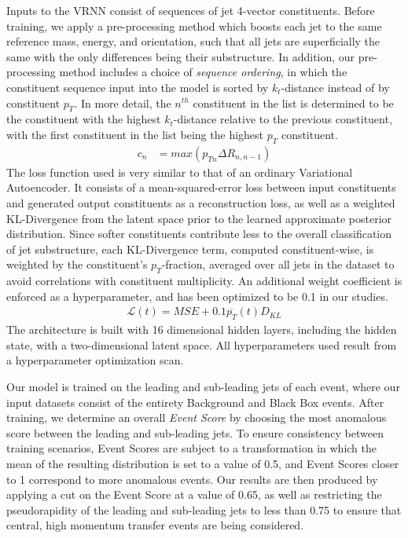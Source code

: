 \documentclass[letterpaper,11pt]{article}
\begin{document}
Inputs to the VRNN consist of sequences of jet 4-vector constituents. Before training, we apply a pre-processing method which boosts each jet to the same reference mass, energy, and orientation, such that all jets are superficially the same with the only differences being their substructure. In addition, our pre-processing method includes a choice of \textit{sequence ordering}, in which the constituent sequence input into the model is sorted by $k_{t}$-distance instead of by constituent $p_{T}$. In more detail, the $n^{th}$ constituent in the list is determined to be the constituent with the highest $k_{t}$-distance relative to the previous constituent, with the first constituent in the list being the highest $p_{T}$ constituent.
\begin{align*}
c_{n} &= max(p_{Tn}\Delta R_{n, n-1})
\end{align*}
The loss function used is very similar to that of an ordinary Variational Autoencoder. It consists of a mean-squared-error loss between input constituents and generated output constituents as a reconstruction loss, as well as a weighted KL-Divergence from the latent space prior to the learned approximate posterior distribution. Since softer constituents contribute less to the overall classification of jet substructure, each KL-Divergence term, computed constituent-wise, is weighted by the constituent's $p_{T}$-fraction, averaged over all jets in the dataset to avoid correlations with constituent multiplicity. An additional weight coefficient is enforced as a hyperparameter, and has been optimized to be 0.1 in our studies. 
\begin{align*}
\mathcal{L}(t)=MSE+0.1\overline{p_T}(t)D_{KL}
\end{align*}
The architecture is built with 16 dimensional hidden layers, including the hidden state, with a two-dimensional latent space. All hyperparameters used result from a hyperparameter optimization scan. 

Our model is trained on the leading and sub-leading jets of each event, where our input datasets consist of the entirety Background and Black Box events. After training, we determine an overall \textit{Event Score} by choosing the most anomalous score between the leading and sub-leading jets. To ensure consistency between training scenarios, Event Scores are subject to a transformation in which the mean of the resulting distribution is set to a value of 0.5, and Event Scores closer to 1 correspond to more anomalous events. Our results are then produced by applying a cut on the Event Score at a value of 0.65, as well as restricting the pseudorapidity of the leading and sub-leading jets to less than 0.75 to ensure that central, high momentum transfer events are being considered. 
\end{document}
